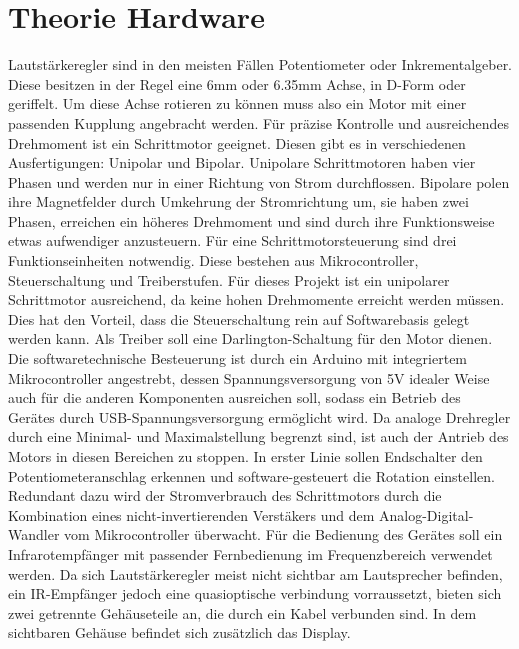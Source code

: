\documentclass[11pt, titlepage, fleqn]{report}
\begin{document}
		\section{Theorie Hardware}
		\label{sec:Theorie Hardware}
			\sloppy \nohyphens{
			Lautstärkeregler sind in den meisten Fällen Potentiometer oder Inkrementalgeber. %
			Diese besitzen in der Regel eine 6mm oder 6.35mm Achse, in D-Form oder geriffelt. Um diese Achse rotieren zu können muss also ein Motor mit einer passenden Kupplung angebracht werden. Für präzise Kontrolle und ausreichendes Drehmoment ist ein Schrittmotor geeignet. Diesen gibt es in verschiedenen Ausfertigungen: Unipolar und Bipolar. Unipolare Schrittmotoren haben vier Phasen und werden nur in einer Richtung von Strom durchflossen. Bipolare polen ihre Magnetfelder durch Umkehrung der Stromrichtung um, sie haben zwei Phasen, erreichen ein höheres Drehmoment und sind durch ihre Funktionsweise etwas aufwendiger anzusteuern. 
			Für eine Schrittmotorsteuerung sind drei Funktionseinheiten notwendig. Diese bestehen aus Mikrocontroller, Steuerschaltung und Treiberstufen. Für dieses Projekt ist ein unipolarer Schrittmotor ausreichend, da keine hohen Drehmomente erreicht werden müssen. Dies hat den Vorteil, dass die Steuerschaltung rein auf Softwarebasis gelegt werden kann. Als Treiber soll eine Darlington-Schaltung für den Motor dienen. Die softwaretechnische Besteuerung ist durch ein Arduino mit integriertem Mikrocontroller angestrebt, dessen Spannungsversorgung von 5V idealer Weise auch für die anderen Komponenten ausreichen soll, sodass ein Betrieb des Gerätes durch USB-Spannungsversorgung ermöglicht wird. Da analoge Drehregler durch eine Minimal- und Maximalstellung begrenzt sind, ist auch der Antrieb des Motors in diesen Bereichen zu stoppen. In erster Linie sollen Endschalter den Potentiometeranschlag erkennen und software-gesteuert die Rotation einstellen. Redundant dazu wird der Stromverbrauch des Schrittmotors durch die Kombination eines nicht-invertierenden Verstäkers und dem Analog-Digital-Wandler vom Mikrocontroller überwacht. Für die Bedienung des Gerätes soll ein Infrarotempfänger mit passender Fernbedienung im Frequenzbereich verwendet werden. Da sich Lautstärkeregler meist nicht sichtbar am Lautsprecher befinden, ein IR-Empfänger jedoch eine quasioptische verbindung vorraussetzt, bieten sich zwei getrennte Gehäuseteile an, die durch ein Kabel verbunden sind. In dem sichtbaren Gehäuse befindet sich zusätzlich das Display.}
		\newpage
\end{document}

